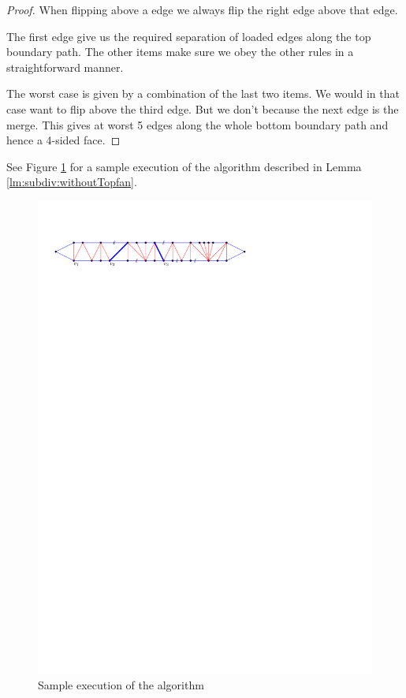 \begin{proof}
  When flipping above a edge we always flip the right edge above that edge.

  The first edge give us the required separation of loaded edges along the top boundary path. The other items make sure we obey the other rules in a straightforward manner.

  The worst case is given by a combination of the last two items. We would in that case want to flip above the third edge. But we don't because the next edge is the merge. This gives at worst 5 edges along the whole bottom boundary path and hence a 4-sided face.



\end{proof}

See Figure \ref{fig:subdiv:sampleExecution} for a sample execution of the algorithm described in Lemma \ref{lm:subdiv:withoutTopfan}.

\begin{figure}[h]
  \centering
  \includegraphics[scale=1]{blueFaceSubdivision/img/sampleExecution}
  \caption{Sample execution of the algorithm}
  \label{fig:subdiv:sampleExecution}
\end{figure}


